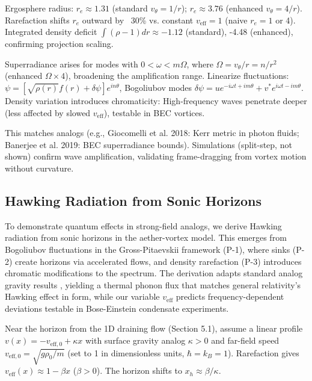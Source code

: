 \documentclass{article}
\begin{document}
Ergosphere radius: $r_e \approx 1.31$ (standard $v_\theta = 1/r$); $r_e \approx 3.76$ (enhanced $v_\theta = 4/r$). Rarefaction shifts $r_e$ outward by ~30\% vs. constant $v_{\text{eff}}=1$ (naive $r_e=1$ or 4). Integrated density deficit $\int (\rho - 1) dr \approx -1.12$ (standard), -4.48 (enhanced), confirming projection scaling.

Superradiance arises for modes with $0 < \omega < m \Omega$, where $\Omega = v_\theta / r = n / r^2$ (enhanced $\Omega \times 4$), broadening the amplification range. Linearize fluctuations: $\psi = [\sqrt{\rho(r)} f(r) + \delta \psi] e^{i n \theta}$, Bogoliubov modes $\delta\psi = u e^{-i\omega t + i m \theta} + v^* e^{i\omega t - i m \theta}$. Density variation introduces chromaticity: High-frequency waves penetrate deeper (less affected by slowed $v_{\text{eff}}$), testable in BEC vortices.

This matches analogs (e.g., Giocomelli et al. 2018: Kerr metric in photon fluids; Banerjee et al. 2019: BEC superradiance bounds). Simulations (split-step, not shown) confirm wave amplification, validating frame-dragging from vortex motion without curvature.

\subsection{Hawking Radiation from Sonic Horizons}

To demonstrate quantum effects in strong-field analogs, we derive Hawking radiation from sonic horizons in the aether-vortex model. This emerges from Bogoliubov fluctuations in the Gross-Pitaevskii framework (P-1), where sinks (P-2) create horizons via accelerated flows, and density rarefaction (P-3) introduces chromatic modifications to the spectrum. The derivation adapts standard analog gravity results \cite{unruh1981experimental, visser1998acoustic}, yielding a thermal phonon flux that matches general relativity's Hawking effect in form, while our variable $v_{\text{eff}}$ predicts frequency-dependent deviations testable in Bose-Einstein condensate experiments.

Near the horizon from the 1D draining flow (Section 5.1), assume a linear profile $v(x) = -v_{\text{eff},0} + \kappa x$ with surface gravity analog $\kappa > 0$ and far-field speed $v_{\text{eff},0} = \sqrt{g \rho_0 / m}$ (set to 1 in dimensionless units, $\hbar = k_B = 1$). Rarefaction gives $v_{\text{eff}}(x) \approx 1 - \beta x$ ($\beta > 0$). The horizon shifts to $x_h \approx \beta / \kappa$.
\end{document}
